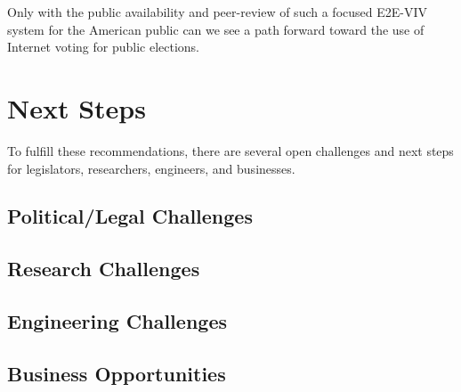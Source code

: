 Only with the public availability and peer-review of such a focused
E2E-VIV system for the American public can we see a path forward
toward the use of Internet voting for public elections.

\section{Next Steps}
\label{sec:next-steps}

To fulfill these recommendations, there are several open challenges
and next steps for legislators, researchers, engineers, and
businesses.

\subsection{Political/Legal Challenges}
\subsection{Research Challenges}
\subsection{Engineering Challenges}
\subsection{Business Opportunities}
